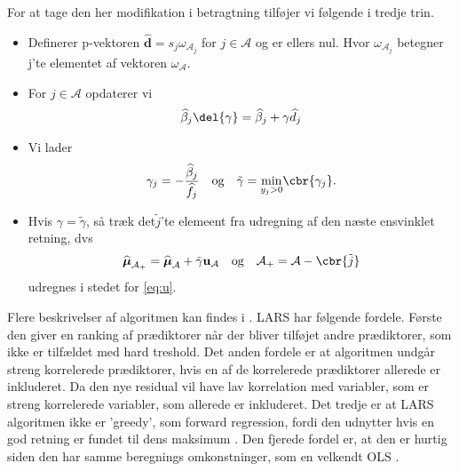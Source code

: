 For at tage den her modifikation i betragtning tilføjer vi følgende i tredje trin. 
\begin{itemize}
\item Definerer p-vektoren $\widehat{\textbf{d}} = s_j \omega_{\mathcal{A}_j}$ for $j \in \mathcal{A}$ og er ellers nul. Hvor $ \omega_{\mathcal{A}_j}$ betegner j'te elementet af vektoren $\omega_{\mathcal{A}}$. 
\item For $j \in \mathcal{A}$ opdaterer vi 
\begin{align*}
\widehat{\beta}_j \del{\gamma} = \widehat{\beta}_j + \gamma \widehat{d}_j 
\end{align*}
\item Vi lader 
\begin{align*}
\gamma_j = - \frac{\widehat{\beta}_j}{\widehat{f}_j} \quad \text{og} \quad \tilde\gamma = \underset{y_j > 0}{\min} \cbr{\gamma_j}. 
\end{align*}
\item Hvis $\gamma = \tilde{\gamma}$, så træk det$ \tilde{j}$'te elemeent fra udregning af den næste ensvinklet retning, dvs 
\begin{align*}
\widehat{\boldsymbol\mu}_{\mathcal{A}_+} = \widehat{\boldsymbol\mu}_\mathcal{A} + \tilde{\gamma} \textbf{u}_\mathcal{A} \quad \text{og} \quad \mathcal{A_+} = \mathcal{A}- \cbr{\tilde{j}}
\end{align*}
udregnes i stedet for \eqref{eq:u}.
\end{itemize}

Flere beskrivelser af algoritmen kan findes i \citep{efron}. 
LARS har følgende fordele. Første den giver en ranking af prædiktorer når der bliver tilføjet andre prædiktorer, som ikke er tilfældet med hard treshold. Det anden fordele er at algoritmen undgår streng korrelerede prædiktorer, hvis en af de korrelerede prædiktorer allerede er inkluderet. Da den nye residual vil have lav korrelation med variabler, som er streng korrelerede variabler, som allerede er inkluderet. 
Det tredje er at LARS algoritmen ikke er 'greedy', som forward regression, fordi den udnytter hvis en god retning er fundet til dens maksimum . Den fjerede fordel er, at den er hurtig siden den har samme beregnings omkonstninger, som en velkendt OLS \citep{hui_hastie}. 

